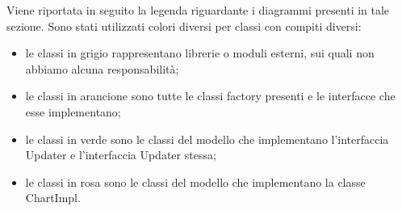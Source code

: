 		Viene riportata in seguito la legenda riguardante i diagrammi presenti in tale sezione. Sono stati utilizzati colori diversi per classi con compiti diversi:
		\begin{itemize}
			\item le classi in grigio rappresentano librerie o moduli esterni, sui quali non abbiamo alcuna responsabilità;
			\item le classi in arancione sono tutte le classi factory presenti e le interfacce che esse implementano;
			\item le classi in verde sono le classi del modello che implementano l'interfaccia Updater e l'interfaccia Updater stessa;
			\item le classi in rosa sono le classi del modello che implementano la classe ChartImpl.
		\end{itemize}
		
		
		
		
		
		
